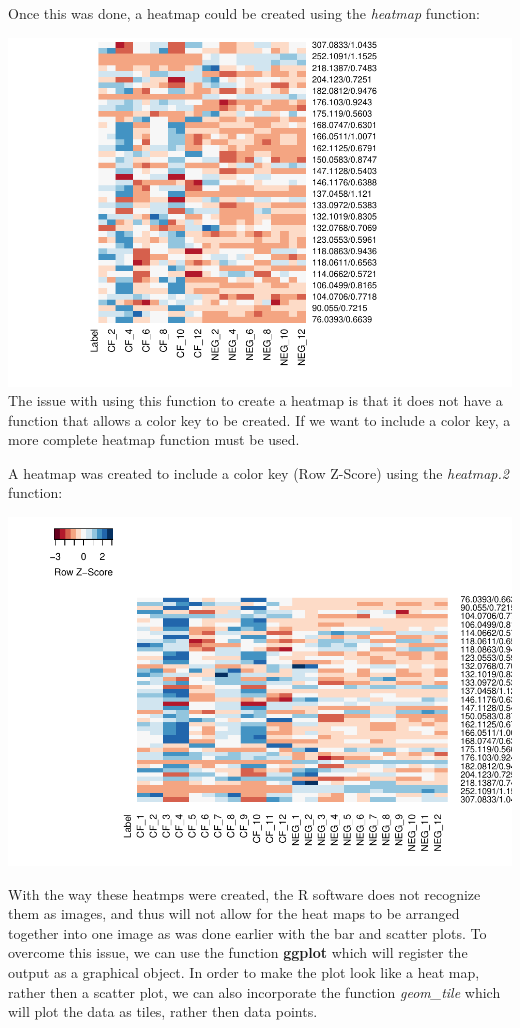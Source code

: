 \documentclass[]{elsarticle} %
\makeatletter
\def\maxwidth{\ifdim\Gin@nat@width>\linewidth\linewidth
\else\Gin@nat@width\fi}
\let\Oldincludegraphics\includegraphics
\renewcommand{\includegraphics}[1]{\Oldincludegraphics[width=\maxwidth]{#1}}
\makeatother
\begin{document}
Once this was done, a heatmap could be created using the \emph{heatmap}
function:

\includegraphics{06DecFinalDeliverableArticle_files/figure-latex/unnamed-chunk-4-1.pdf}
The issue with using this function to create a heatmap is that it does
not have a function that allows a color key to be created. If we want to
include a color key, a more complete heatmap function must be used.

A heatmap was created to include a color key (Row Z-Score) using the
\emph{heatmap.2} function:

\includegraphics{06DecFinalDeliverableArticle_files/figure-latex/unnamed-chunk-5-1.pdf}

With the way these heatmps were created, the R software does not
recognize them as images, and thus will not allow for the heat maps to
be arranged together into one image as was done earlier with the bar and
scatter plots. To overcome this issue, we can use the function
\textbf{ggplot} which will register the output as a graphical object. In
order to make the plot look like a heat map, rather then a scatter plot,
we can also incorporate the function \emph{geom\_tile} which will plot
the data as tiles, rather then data points.
\end{document}
